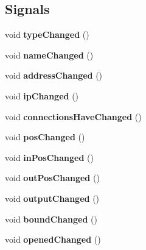 \subsection*{Signals}
\begin{DoxyCompactItemize}
\item 
\mbox{\label{classNode_adcbfe89009445eca17b8d9e122c504f4}} 
void {\bfseries type\+Changed} ()
\item 
\mbox{\label{classNode_ab1a77a5a5faea93bbf412647885688f9}} 
void {\bfseries name\+Changed} ()
\item 
\mbox{\label{classNode_aacc34a3cf4a311bf9d655c8b90098f6a}} 
void {\bfseries address\+Changed} ()
\item 
\mbox{\label{classNode_ae985827a18c3c371a4979e93fd18f6a6}} 
void {\bfseries ip\+Changed} ()
\item 
\mbox{\label{classNode_a8454690655da62155f182fcc1e523bfb}} 
void {\bfseries connections\+Have\+Changed} ()
\item 
\mbox{\label{classNode_a7ef0676f32b351a179a0ef09491b7dbd}} 
void {\bfseries pos\+Changed} ()
\item 
\mbox{\label{classNode_a71aeb141261b0cacb7e4562f9d3e3584}} 
void {\bfseries in\+Pos\+Changed} ()
\item 
\mbox{\label{classNode_a672f3bac02b8d931dbc70221bcec5f82}} 
void {\bfseries out\+Pos\+Changed} ()
\item 
\mbox{\label{classNode_a9d5d3ed653b8334849f3c0738dc6000e}} 
void {\bfseries output\+Changed} ()
\item 
\mbox{\label{classNode_a64a8638185a74040be7526961bf60dca}} 
void {\bfseries bound\+Changed} ()
\item 
\mbox{\label{classNode_a9e9cd320a947a1d2ee154430295a5081}} 
void {\bfseries opened\+Changed} ()
\item 
\mbox{\label{classNode_a03a32d400001bc8871a6bd5f31c70b19}} 

\end{DoxyCompactItemize}
